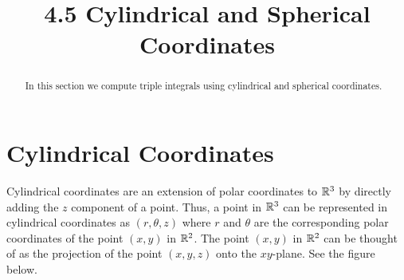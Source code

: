 \documentclass[handout]{ximera}
\title{4.5 Cylindrical and Spherical Coordinates}
\begin{document}
\begin{abstract}
In this section we compute triple integrals using cylindrical and spherical coordinates.
\end{abstract}
 
\maketitle

\section{Cylindrical Coordinates}
Cylindrical coordinates are an extension of polar coordinates to $\mathbb R^3$ by directly adding the $z$ component of a point.
Thus, a point in $\mathbb R^3$ can be represented in cylindrical coordinates as $(r, \theta, z)$ 
where $r$ and $\theta$ are the corresponding polar coordinates of the point 
$(x,y)$ in $\mathbb R^2$.  The point $(x,y)$ in $\mathbb R^2$ can be thought of as the projection of the point $(x,y,z)$ onto the $xy$-plane.
See the figure below.

\begin{image}
\end{image}
\end{document}
